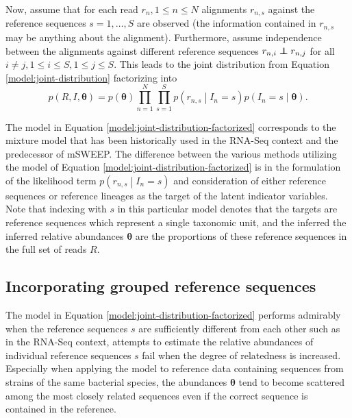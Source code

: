 \documentclass[officiallayout]{tktla}
\newcommand\indept{\protect\mathpalette{\protect\independenT}{\perp}}
\def\independenT#1#2{\mathrel{\rlap{$#1#2$}\mkern2mu{#1#2}}}
\begin{document}
Now, assume that for each read $r_{n}, 1 \leq n \leq N$ alignments
$r_{n, s}$ against the reference sequences $s = 1, \dots, S$ are
observed (the information contained in $r_{n, s}$ may be anything
about the alignment). Furthermore, assume independence between the
alignments against different reference sequences $r_{n, i} \indept
r_{n, j}$ for all $i \neq j, 1 \leq i \leq S, 1 \leq j \leq S$. This
leads to the joint distribution from Equation
\ref{model:joint-distribution} factorizing into
\begin{equation}
  \label{model:joint-distribution-factorized}
  p\left(R, I, \boldsymbol\theta\right) = p\left(\boldsymbol\theta\right)\prod_{n = 1}^{N} \prod_{s = 1}^{S} p\left(r_{n, s} \middle| I_{n} = s\right) p\left(I_{n} = s \middle| \boldsymbol\theta\right).
\end{equation}

The model in Equation \ref{model:joint-distribution-factorized}
corresponds to the mixture model that has been historically used in
the RNA-Seq context and the predecessor of mSWEEP. The difference
between the various methods utilizing the model of Equation
\ref{model:joint-distribution-factorized} is in the formulation of the
likelihood term $p\left(r_{n, s} \middle| I_{n} = s\right)$ and
consideration of either reference sequences or reference lineages as
the target of the latent indicator variables. Note that indexing with
$s$ in this particular model denotes that the targets are reference
sequences which represent a single taxonomic unit, and the inferred
the inferred relative abundances $\boldsymbol\theta$ are the
proportions of these reference sequences in the full set of reads $R$.

\subsection{Incorporating grouped reference sequences}

The model in Equation \ref{model:joint-distribution-factorized}
performs admirably when the reference sequences $s$ are sufficiently
different from each other such as in the RNA-Seq context, attempts to
estimate the relative abundances of individual reference sequences $s$
fail when the degree of relatedness is increased. Especially when
applying the model to reference data containing sequences from strains
of the same bacterial species, the abundances $\boldsymbol\theta$ tend
to become scattered among the most closely related sequences
\textemdash even if the correct sequence is contained in the
reference.
\end{document}
